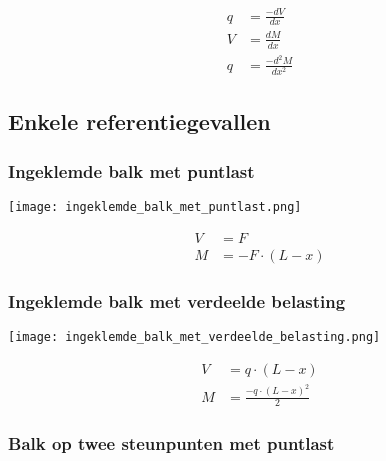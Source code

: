             \begin{align}
                q &= \frac{-dV}{dx}\nonumber\\
                V &= \frac{dM}{dx}\nonumber\\
                q &= \frac{-d^2M}{dx^2}
            \end{align}

        \subsection{Enkele referentiegevallen}
            
            \subsubsection{Ingeklemde balk met puntlast}

                \begin{center}
                    \texttt{[image: ingeklemde\_balk\_met\_puntlast.png]}
                \end{center}

                \begin{align}
                    V &= F\nonumber\\
                    M &= -F\cdot\left(L-x\right)\nonumber
                \end{align}

            \subsubsection{Ingeklemde balk met verdeelde belasting}

                \begin{center}
                    \texttt{[image: ingeklemde\_balk\_met\_verdeelde\_belasting.png]}
                \end{center}

                \begin{align}
                    V &= q\cdot\left(L-x\right)\nonumber\\
                    M &= \frac{-q\cdot\left(L-x\right)^2}{2}\nonumber
                \end{align}

            \subsubsection{Balk op twee steunpunten met puntlast}

